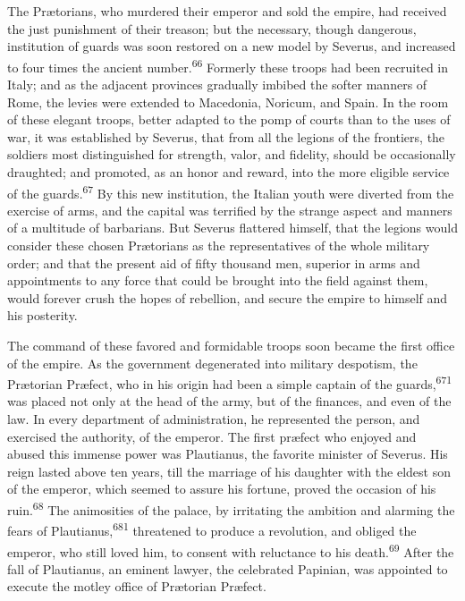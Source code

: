 
The Prætorians, who murdered their emperor and sold the empire,
had received the just punishment of their treason; but the
necessary, though dangerous, institution of guards was soon
restored on a new model by Severus, and increased to four times
the ancient number.\textsuperscript{66} Formerly these troops had been recruited
in Italy; and as the adjacent provinces gradually imbibed the
softer manners of Rome, the levies were extended to Macedonia,
Noricum, and Spain. In the room of these elegant troops, better
adapted to the pomp of courts than to the uses of war, it was
established by Severus, that from all the legions of the
frontiers, the soldiers most distinguished for strength, valor,
and fidelity, should be occasionally draughted; and promoted, as
an honor and reward, into the more eligible service of the
guards.\textsuperscript{67} By this new institution, the Italian youth were
diverted from the exercise of arms, and the capital was terrified
by the strange aspect and manners of a multitude of barbarians.
But Severus flattered himself, that the legions would consider
these chosen Prætorians as the representatives of the whole
military order; and that the present aid of fifty thousand men,
superior in arms and appointments to any force that could be
brought into the field against them, would forever crush the
hopes of rebellion, and secure the empire to himself and his
posterity.



The command of these favored and formidable troops soon became
the first office of the empire. As the government degenerated
into military despotism, the Prætorian Præfect, who in his origin
had been a simple captain of the guards,\textsuperscript{671} was placed not only
at the head of the army, but of the finances, and even of the
law. In every department of administration, he represented the
person, and exercised the authority, of the emperor. The first
præfect who enjoyed and abused this immense power was Plautianus,
the favorite minister of Severus. His reign lasted above ten
years, till the marriage of his daughter with the eldest son of
the emperor, which seemed to assure his fortune, proved the
occasion of his ruin.\textsuperscript{68} The animosities of the palace, by
irritating the ambition and alarming the fears of Plautianus,\textsuperscript{681}
threatened to produce a revolution, and obliged the emperor, who
still loved him, to consent with reluctance to his death.\textsuperscript{69}
After the fall of Plautianus, an eminent lawyer, the celebrated
Papinian, was appointed to execute the motley office of Prætorian
Præfect.

